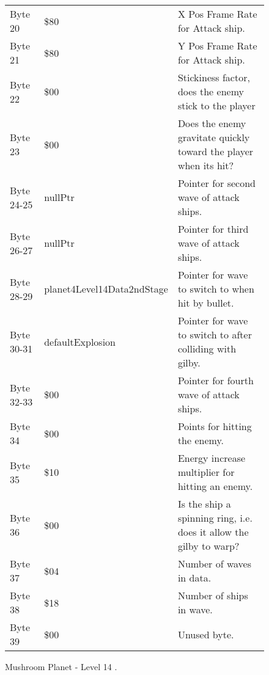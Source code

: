 \begin{figure}[H]
{\begin{adjustbox}{width=12cm}
\begin{tabular}{lll}
 Byte 20    & \$80                        & X Pos Frame Rate for Attack ship.                                   \\
 Byte 21    & \$80                        & Y Pos Frame Rate for Attack ship.                                   \\
 Byte 22    & \$00                        & Stickiness factor, does the enemy stick to the player               \\
 Byte 23    & \$00                        & Does the enemy gravitate quickly toward the player when its hit?    \\
 Byte 24-25 & nullPtr                    & Pointer for second wave of attack ships.                            \\
 Byte 26-27 & nullPtr                    & Pointer for third wave of attack ships.                             \\
 Byte 28-29 & planet4Level14Data2ndStage & Pointer for wave to switch to when hit by bullet.                   \\
 Byte 30-31 & defaultExplosion           & Pointer for  wave to switch to after colliding with gilby.          \\
 Byte 32-33 & \$00                        & Pointer for fourth wave of attack ships.                            \\
 Byte 34    & \$00                        & Points for hitting the enemy.                                       \\
 Byte 35    & \$10                        & Energy increase multiplier for hitting an enemy.                    \\
 Byte 36    & \$00                        & Is the ship a spinning ring, i.e. does it allow the gilby to warp?  \\
 Byte 37    & \$04                        & Number of waves in data.                                            \\
 Byte 38    & \$18                        & Number of ships in wave.                                            \\
 Byte 39    & \$00                        & Unused byte.                                                        \\
\bottomrule
\end{tabular}

  \end{adjustbox}

  }\caption*{Mushroom Planet - Level 14
.}
\end{figure}

